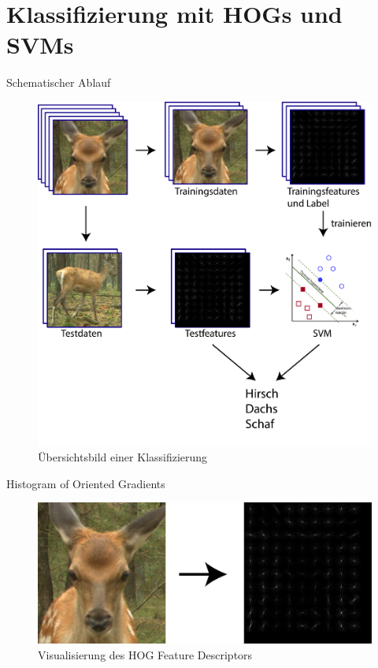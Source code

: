 \section{Klassifizierung mit HOGs und SVMs}
\begin{frame}[t,fragile]{Schematischer Ablauf}
	\begin{figure}
		\centering
		\includegraphics[scale=0.1]{img/ClassificationOverview.png}
		\caption{Übersichtsbild einer Klassifizierung}
	\end{figure}
\end{frame}

\begin{frame}[t,fragile]{Histogram of Oriented Gradients}
	\begin{figure}
		\centering
		\includegraphics[scale=0.20]{img/Img2HOG.png}
		\caption{Visualisierung des HOG Feature Descriptors}
	\end{figure}
\end{frame}

